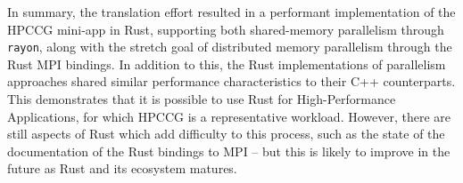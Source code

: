 





In summary, the translation effort resulted in a performant implementation of the HPCCG \acrshort{mini-app} in Rust, supporting both shared-memory parallelism through \texttt{rayon}, along with the stretch goal of distributed memory parallelism through the Rust MPI bindings. In addition to this, the Rust implementations of parallelism approaches shared similar performance characteristics to their C++ counterparts. This demonstrates that it is possible to use Rust for High-Performance Applications, for which HPCCG is a representative workload. However, there are still aspects of Rust which add difficulty to this process, such as the state of the documentation of the Rust bindings to MPI -- but this is likely to improve in the future as Rust and its ecosystem matures.


